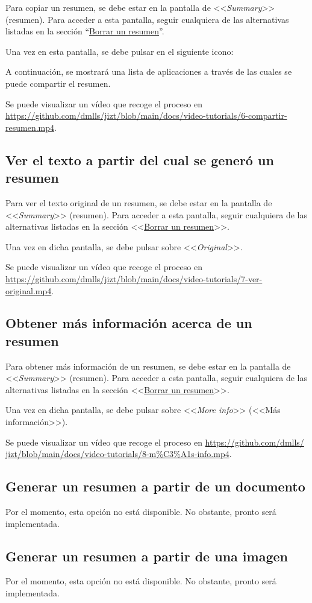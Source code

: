 Para copiar un resumen, se debe estar en la pantalla de <<\emph{Summary}>> (resumen). Para acceder a esta pantalla, seguir cualquiera de las alternativas listadas en la sección ``\hyperref[subsection:borrar]{Borrar un resumen}''.

Una vez en esta pantalla, se debe pulsar en el siguiente icono:

A continuación, se mostrará una lista de aplicaciones a través de las cuales se puede compartir el resumen.

Se puede visualizar un vídeo que recoge el proceso en \href{https://github.com/dmlls/jizt/blob/main/docs/video-tutorials/6-compartir-resumen.mp4}{https://github.com/\newline dmlls/jizt/blob/main/docs/video-tutorials/6-compartir-resumen.mp4}.

\subsection{Ver el texto a partir del cual se generó un resumen}

Para ver el texto original de un resumen, se debe estar en la pantalla de <<\emph{Summary}>> (resumen). Para acceder a esta pantalla, seguir cualquiera de las alternativas listadas en la sección <<\hyperref[subsection:borrar]{Borrar un resumen}>>.

Una vez en dicha pantalla, se debe pulsar sobre <<\emph{Original}>>.

Se puede visualizar un vídeo que recoge el proceso en \href{https://github.com/dmlls/jizt/blob/main/docs/video-tutorials/7-ver-original.mp4}{https://github.com/\newline dmlls/jizt/blob/main/docs/video-tutorials/7-ver-original.mp4}.

\subsection{Obtener más información acerca de un resumen}

Para obtener más información de un resumen, se debe estar en la pantalla de <<\emph{Summary}>> (resumen). Para acceder a esta pantalla, seguir cualquiera de las alternativas listadas en la sección <<\hyperref[subsection:borrar]{Borrar un resumen}>>.

Una vez en dicha pantalla, se debe pulsar sobre <<\emph{More info}>> (<<Más información>>).

Se puede visualizar un vídeo que recoge el proceso en \href{https://github.com/dmlls/jizt/blob/main/docs/video-tutorials/8-m\%C3\%A1s-info.mp4}{https://github.com/\newline dmlls/ jizt/blob/main/docs/video-tutorials/8-m\%C3\%A1s-info.mp4}.

\subsection{Generar un resumen a partir de un documento}

Por el momento, esta opción no está disponible. No obstante, pronto será implementada.

\subsection{Generar un resumen a partir de una imagen}

Por el momento, esta opción no está disponible. No obstante, pronto será implementada.